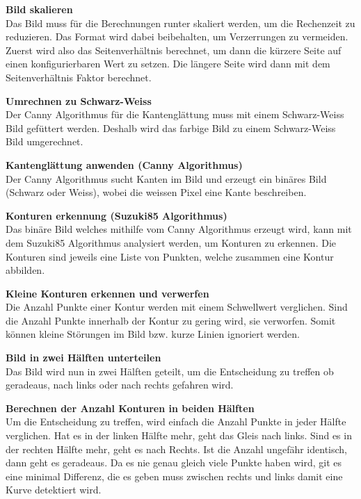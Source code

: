 \documentclass[../../main.tex]{subfiles}
\begin{document}
\textbf{Bild skalieren}\\
Das Bild muss für die Berechnungen runter skaliert werden, um die Rechenzeit zu reduzieren. Das Format
wird dabei beibehalten, um Verzerrungen zu vermeiden. Zuerst wird also das Seitenverhältnis berechnet, um dann
die kürzere Seite auf einen konfigurierbaren Wert zu setzen. Die längere Seite wird dann mit dem Seitenverhältnis Faktor
berechnet.

\textbf{Umrechnen zu Schwarz-Weiss}\\
Der Canny Algorithmus für die Kantenglättung muss mit einem Schwarz-Weiss Bild gefüttert werden. Deshalb wird das farbige Bild
zu einem Schwarz-Weiss Bild umgerechnet.

\textbf{Kantenglättung anwenden (Canny Algorithmus)}\\
Der Canny Algorithmus sucht Kanten im Bild und erzeugt ein binäres Bild (Schwarz oder Weiss), wobei die weissen Pixel eine Kante
beschreiben.

\textbf{Konturen erkennung (Suzuki85 Algorithmus)}\\
Das binäre Bild welches mithilfe vom Canny Algorithmus erzeugt wird, kann mit dem Suzuki85 Algorithmus analysiert werden, um Konturen zu erkennen.
Die Konturen sind jeweils eine Liste von Punkten, welche zusammen eine Kontur abbilden.

\textbf{Kleine Konturen erkennen und verwerfen}\\
Die Anzahl Punkte einer Kontur werden mit einem Schwellwert verglichen. Sind die Anzahl Punkte innerhalb der Kontur zu gering wird, sie verworfen.
Somit können kleine Störungen im Bild bzw. kurze Linien ignoriert werden.

\textbf{Bild in zwei Hälften unterteilen}\\
Das Bild wird nun in zwei Hälften geteilt, um die Entscheidung zu treffen ob geradeaus, nach links oder nach rechts gefahren wird.

\textbf{Berechnen der Anzahl Konturen in beiden Hälften}\\
Um die Entscheidung zu treffen, wird einfach die Anzahl Punkte in jeder Hälfte verglichen. Hat es in der linken Hälfte mehr, geht das Gleis nach links.
Sind es in der rechten Hälfte mehr, geht es nach Rechts. Ist die Anzahl ungefähr identisch, dann geht es geradeaus. Da es nie genau gleich viele Punkte haben wird,
git es eine minimal Differenz, die es geben muss zwischen rechts und links damit eine Kurve detektiert wird.
\end{document}
